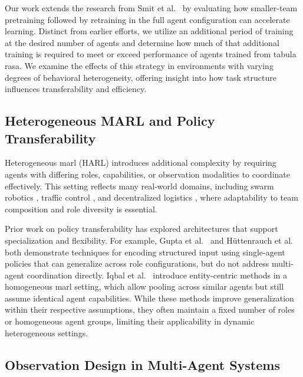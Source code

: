 \documentclass{article}
\begin{document}
Our work extends the research from Smit et al.~\cite{smit2023}
by evaluating how smaller-team pretraining followed 
by retraining in the full agent configuration can accelerate learning. 
Distinct from earlier efforts, we utilize an additional period of training at 
the desired number of agents and determine how much of that additional training 
is required to meet or exceed performance of agents trained from tabula rasa.
We examine the effects of this strategy in environments with varying degrees of 
behavioral heterogeneity, offering insight into how task structure influences 
transferability and efficiency.

\subsection{Heterogeneous MARL and Policy Transferability}

Heterogeneous \gls{marl} (HARL) introduces additional complexity by requiring agents with 
differing roles, capabilities, or observation modalities to coordinate effectively. 
This setting reflects many real-world domains, including swarm robotics \cite{hoang2023}, 
traffic control \cite{calvo2018}, and decentralized logistics \cite{rizk2019}, 
where adaptability to team composition and role diversity is essential.

Prior work on policy transferability has explored architectures that support specialization 
and flexibility. For example, Gupta et al.~\cite{gupta2017a} and H{\"u}ttenrauch 
et al.~\cite{huttenrauch2019} both demonstrate techniques for encoding structured input 
using single-agent policies that can generalize across role configurations, but do not 
address multi-agent coordination directly. Iqbal et al.~\cite{iqbal2021} introduce 
entity-centric methods in a homogeneous \gls{marl} setting, which allow pooling across similar 
agents but still assume identical agent capabilities. While these methods improve 
generalization within their respective assumptions, they often maintain a fixed number of roles 
or homogeneous agent groups, limiting their applicability in dynamic heterogeneous settings.


\subsection{Observation Design in Multi-Agent Systems}
\label{con1:sec:related_work-observation_design}
\end{document}
